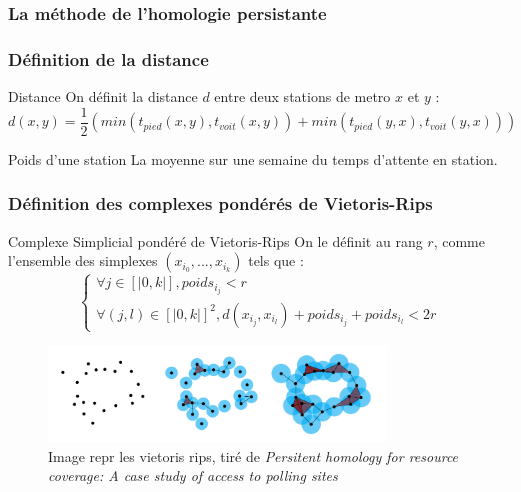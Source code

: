 \documentclass{beamer}
\begin{document}
\begin{frame}
    \frametitle{La méthode de l'homologie persistante}

\end{frame}

\begin{frame}
    \frametitle{Définition de la distance}
    
    \begin{block}{Distance}
        On définit la distance $d$ entre deux stations de metro $x$ et $y$ : 
        $$ d(x,y) = \frac{1}{2}(min(t_{pied}(x,y), t_{voit}(x,y)) + min(t_{pied}(y,x), t_{voit}(y,x)))$$
    \end{block}

    \begin{block}{Poids d'une station}
        La moyenne sur une semaine du temps d'attente en station.
    \end{block}
\end{frame}

\begin{frame}
    \frametitle{Définition des complexes pondérés de Vietoris-Rips}
    \begin{block}{Complexe Simplicial pondéré de Vietoris-Rips}
        On le définit au rang $r$, comme l'ensemble des simplexes $(x_{i_0}, ..., x_{i_k})$ tels que : 
        $$
            \begin{cases}
                \forall j \in [|0, k|], poids_{i_j} < r\\
                \forall (j,l) \in [|0, k|]^2, d(x_{i_j}, x_{i_l}) + poids_{i_j} + poids_{i_l} < 2r
            \end{cases}
        $$
    \end{block}

    \begin{figure}
        \includegraphics[width=0.8\textwidth]{../images/cech.png}
        \caption{Image repr les vietoris rips, tiré de \textit{Persitent homology for resource coverage: A case study of access to polling sites}}
    \end{figure}
    
\end{frame}
\end{document}
